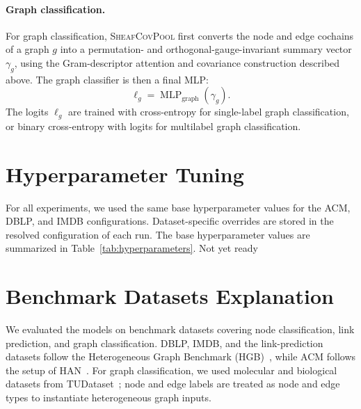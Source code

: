 \documentclass[sigconf,anonymous,review]{acmart}
\newcommand{\sheafcovpool}{\textsc{SheafCovPool}}
\begin{document}
\paragraph{Graph classification.}
For graph classification, \sheafcovpool{} first converts the node and edge cochains of a graph
\(g\) into a permutation- and orthogonal-gauge-invariant summary vector \(\gamma_g\), using the
Gram-descriptor attention and covariance construction described above.  The graph classifier is
then a final MLP:
\begin{equation}
  \ell_g
  =
  \operatorname{MLP}_{\mathrm{graph}}(\gamma_g).
  \label{eq:graph-readout}
\end{equation}
The logits \(\ell_g\) are trained with cross-entropy for single-label graph classification, or
binary cross-entropy with logits for multilabel graph classification.

\section{Hyperparameter Tuning}

For all experiments, we used the same base hyperparameter values for the ACM, DBLP, and IMDB configurations. Dataset-specific overrides are stored in the resolved configuration of each run. The base hyperparameter values are summarized in Table~\ref{tab:hyperparameters}.
Not yet ready
\label{app:hyperparameters}

\begin{table}[t]
  \centering
  \caption{Base hyperparameter values used in the ACM, DBLP, and IMDB
  configurations. Dataset-specific overrides are stored in the resolved
  configuration of each run.}
  \label{tab:hyperparameters}
  \scriptsize
  
\end{table}

\section{Benchmark Datasets Explanation}
\label{app:benchmark-datasets}

We evaluated the models on benchmark datasets covering node classification,
link prediction, and graph classification. DBLP, IMDB, and the link-prediction
datasets follow the Heterogeneous Graph Benchmark (HGB)~\cite{lv2021hgb}, while
ACM follows the setup of HAN~\cite{wang2019han}. For graph classification, we
used molecular and biological datasets from TUDataset~\cite{morris2020tudataset};
node and edge labels are treated as node and edge types to instantiate
heterogeneous graph inputs.
\end{document}
